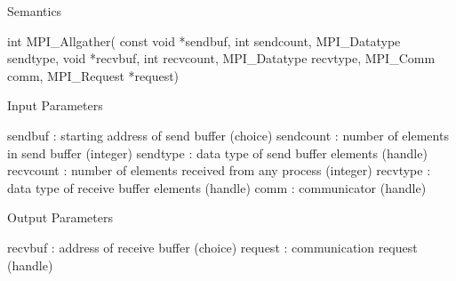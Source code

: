 Semantics

int MPI_Allgather(
    const void *sendbuf, int sendcount, MPI_Datatype sendtype,
    void *recvbuf, int recvcount, MPI_Datatype recvtype,
    MPI_Comm comm, MPI_Request *request)

Input Parameters

sendbuf : starting address of send buffer (choice)
sendcount : number of elements in send buffer (integer)
sendtype : data type of send buffer elements (handle)
recvcount : number of elements received from any process (integer)
recvtype : data type of receive buffer elements (handle)
comm : communicator (handle)

Output Parameters

recvbuf : address of receive buffer (choice)
request : communication request (handle)
